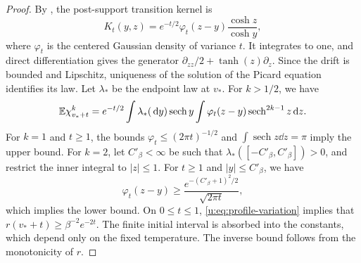 \begin{proof}
By \cite[Lemma~3, proof]{oai-typical-upper}, the post-support
transition kernel is
\[
 K_t(y,z)=e^{-t/2}\varphi_t(z-y)\frac{\cosh z}{\cosh y},
\]
where $\varphi_t$ is the centered Gaussian density of variance $t$.
It integrates to one, and direct differentiation gives the generator
$\partial_{zz}/2+\tanh(z)\partial_z$. Since the drift is bounded and
Lipschitz, uniqueness of the solution of the Picard equation
identifies its law. Let $\lambda_*$ be
the endpoint law at $v_*$. For $k>1/2$, we have
\[
 \mathbb E\chi_{v_*+t}^k=e^{-t/2}\int\lambda_*(\,\mathrm d y)\operatorname{sech}y
       \int\varphi_t(z-y)\operatorname{sech}^{2k-1}z\,\mathrm d z.
\]
For $k=1$ and $t\ge1$, the bounds
$\varphi_t\le(2\pi t)^{-1/2}$ and
$\int\operatorname{sech}z\dd z=\pi$ imply the upper bound.
For $k=2$, let $C'_\beta<\infty$ be such that
$\lambda_*([-C'_\beta,C'_\beta])>0$, and restrict the inner integral
to $|z|\le1$. For $t\ge1$ and $|y|\le C'_\beta$, we have
\[
 \varphi_t(z-y)\ge
 \frac{e^{-(C'_\beta+1)^2/2}}{\sqrt{2\pi t}},
\]
which implies the lower bound. On $0\le t\le1$,
\eqref{u:eq:profile-variation} implies that
$r(v_*+t)\ge\beta^{-2}e^{-2t}$. The finite initial interval is
absorbed into the constants, which depend only on the fixed
temperature. The inverse bound follows from the monotonicity of $r$.
\end{proof}
